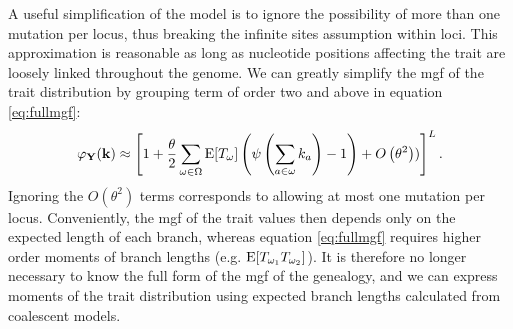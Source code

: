 A useful simplification of the model is to ignore the possibility of more than
one mutation per locus, thus breaking the infinite sites assumption within loci.
This approximation is reasonable as long as nucleotide positions affecting the
trait are loosely linked throughout the genome. We can greatly simplify the mgf
of the trait distribution by grouping term of order two and above in equation
\eqref{eq:fullmgf}:
\begin{equation}
\label{eq:lowmut}
\varphi_{\mathbf{Y}}(\mathbf{k}) \approx \left[ 1 + \frac{\theta}{2} \sum_{\omega \in \Omega}
  \mathrm{E}[T_\omega] \left( \psi\left( \sum_{a \in \omega} k_a\right) -1 \right) +
  O\left( \theta^2 \right))\right]^L.
\end{equation}
Ignoring the $O\left( \theta^2 \right)$ terms corresponds to allowing at most
one mutation per locus. Conveniently, the mgf of the trait values then depends
only on the expected length of each branch, whereas equation \eqref{eq:fullmgf}
requires higher order moments of branch lengths (e.g.
$\mathrm{E}[T_{\omega_1}T_{\omega_2}]$). It is therefore no longer necessary to know the
full form of the mgf of the genealogy, and we can express moments of the trait
distribution using expected branch lengths calculated from coalescent models.

